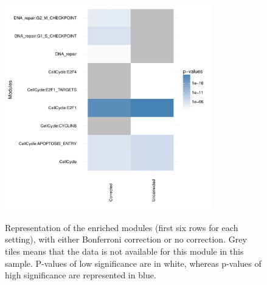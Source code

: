 \begin{figure}[h!]
	\centering
    \caption{Representation of the enriched modules (first six rows for each setting), with
    either Bonferroni correction or no correction. Grey tiles means that the
    data is not available for this module in this sample. P-values of low
    significance are in white, whereas p-values of high significance are
    represented in blue.}
    \includegraphics[width=0.8\textwidth]{figures/comparison_corrected_unc.pdf}
    \label{fig:heatm}

\end{figure}


